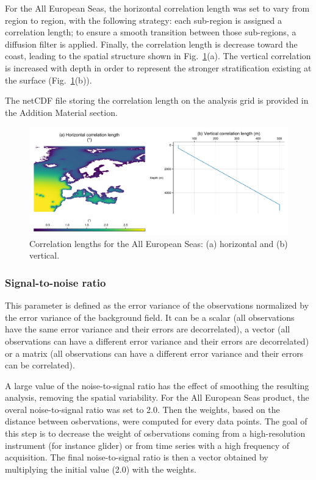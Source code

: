 \documentclass[essd, manuscript]{copernicus}
\begin{document}
For the All European Seas, the horizontal correlation length was set to vary from region to region, with the following strategy: each sub-region is assigned a correlation length; to ensure a smooth transition between those sub-regions, a diffusion filter is applied. Finally, the correlation length is decrease toward the coast, leading to the spatial structure shown in Fig.~\ref{fig:correlation_length}(a). The vertical correlation is increased with depth in order to represent the stronger stratification existing at the surface (Fig.~\ref{fig:correlation_length}(b)).

The netCDF file storing the correlation length on the analysis grid is provided in the Addition Material section.

\begin{figure}[t]
\centering
\includegraphics[width=\textwidth]{correlation_length.pdf}
\caption{Correlation lengths for the All European Seas: (a) horizontal and (b) vertical.\label{fig:correlation_length}}
\end{figure}

\subsubsection{Signal-to-noise ratio}

This parameter is defined as the error variance of the observations normalized by the error variance of the background field. It can be a scalar (all observations have the same error variance and their errors are decorrelated), a vector (all observations can have a different error variance and their errors are decorrelated) or a matrix (all observations can have a different error variance and their errors can be correlated). 

A large value of the noise-to-signal ratio has the effect of smoothing the resulting analysis, removing the spatial variability. For the All European Seas product, the overal noise-to-signal ratio was set to 2.0. Then the weights, based on the distance between osbervations, were computed for every data points. The goal of this step is to decrease the weight of osbervations coming from a high-resolution instrument (for instance glider) or from time series with a high frequency of acquisition. The final noise-to-signal ratio is then a vector obtained by multiplying the initial value (2.0) with the weights.
\end{document}
